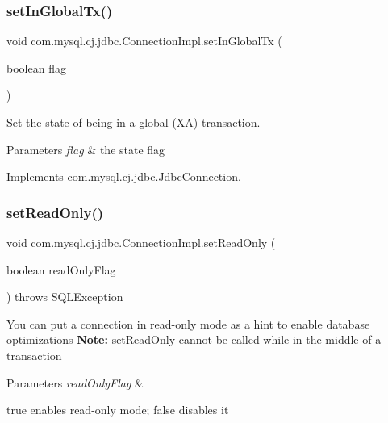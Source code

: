 \subsubsection{\texorpdfstring{set\+In\+Global\+Tx()}{setInGlobalTx()}}
{\footnotesize\ttfamily void com.\+mysql.\+cj.\+jdbc.\+Connection\+Impl.\+set\+In\+Global\+Tx (\begin{DoxyParamCaption}\item[{boolean}]{flag }\end{DoxyParamCaption})}

Set the state of being in a global (XA) transaction.


\begin{DoxyParams}{Parameters}
{\em flag} & the state flag \\
\hline
\end{DoxyParams}


Implements \mbox{\hyperlink{interfacecom_1_1mysql_1_1cj_1_1jdbc_1_1_jdbc_connection_af7cff3ba67d2b787b04c3eff40f9e087}{com.\+mysql.\+cj.\+jdbc.\+Jdbc\+Connection}}.

\mbox{\label{classcom_1_1mysql_1_1cj_1_1jdbc_1_1_connection_impl_a52d1622cdb325e2780cd5f224afc09e0}} 
\subsubsection{\texorpdfstring{set\+Read\+Only()}{setReadOnly()}}
{\footnotesize\ttfamily void com.\+mysql.\+cj.\+jdbc.\+Connection\+Impl.\+set\+Read\+Only (\begin{DoxyParamCaption}\item[{boolean}]{read\+Only\+Flag }\end{DoxyParamCaption}) throws S\+Q\+L\+Exception}

You can put a connection in read-\/only mode as a hint to enable database optimizations {\bfseries Note\+:} set\+Read\+Only cannot be called while in the middle of a transaction


\begin{DoxyParams}{Parameters}
{\em read\+Only\+Flag} & 
\begin{DoxyItemize}
\item true enables read-\/only mode; false disables it 
\end{DoxyItemize}\\
\hline
\end{DoxyParams}


